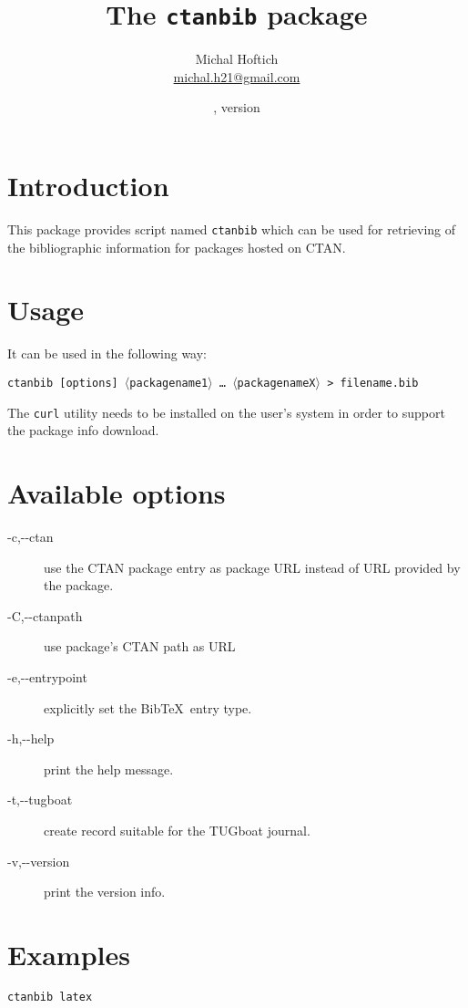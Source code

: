 \documentclass{ltxdoc}
\title{The \texttt{ctanbib} package}
\author{Michal Hoftich\\\href{mailto:michal.h21@gmail.com}{michal.h21@gmail.com}}
\date{\gitdate, version \gitversion}
\newcommand\package[1]{\texttt{#1}}
\begin{document}
\maketitle

\section{Introduction}
This package provides script named \package{ctanbib} which can be used for retrieving of the bibliographic information for packages hosted on CTAN.


\section{Usage}


It can be used in the following way:


\medskip

\noindent\package{ctanbib [options]  $\langle$packagename1$\rangle$ \ldots\ $\langle$packagenameX$\rangle$ > filename.bib}

\medskip

The \texttt{curl} utility needs to be installed on the user's system in order to support the package info download.


\section{Available options}

\begin{description}
  \item[-c,-\/-ctan] use the CTAN package entry as package URL instead of URL provided by the package.
  \item[-C,-\/-ctanpath]   use package's CTAN path as URL
  \item[-e,-\/-entrypoint] explicitly set the Bib\TeX\ entry type.
  \item[-h,-\/-help] print the help message.
  \item[-t,-\/-tugboat] create record suitable for the TUGboat journal.
  \item[-v,-\/-version] print the version info.
\end{description}


\section{Examples}

\begin{verbatim}
ctanbib latex  
\end{verbatim}
\end{document}

